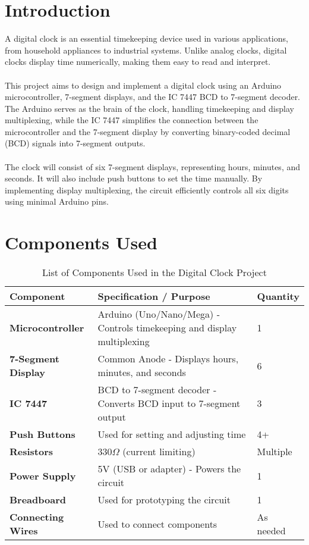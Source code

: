 \documentclass[journal]{IEEEtran}
\begin{document}
\section{Introduction}
A digital clock is an essential timekeeping device used in various applications, from household appliances to industrial systems. Unlike analog clocks, digital clocks display time numerically, making them easy to read and interpret. \\ \\
This project aims to design and implement a digital clock using an Arduino microcontroller, 7-segment displays, and the IC 7447 BCD to 7-segment decoder. The Arduino serves as the brain of the clock, handling timekeeping and display multiplexing, while the IC 7447 simplifies the connection between the microcontroller and the 7-segment display by converting binary-coded decimal (BCD) signals into 7-segment outputs. \\ \\
The clock will consist of six 7-segment displays, representing hours, minutes, and seconds. It will also include push buttons to set the time manually. By implementing display multiplexing, the circuit efficiently controls all six digits using minimal Arduino pins.


\section{Components Used}
\begin{table}[H]
    \centering
    \renewcommand{\arraystretch}{1.2} %
    \begin{tabular}{|p{4cm}|p{5cm}|p{2cm}|}
        \hline
        \textbf{Component} & \textbf{Specification / Purpose} & \textbf{Quantity} \\
        \hline
        \textbf{Microcontroller} & Arduino (Uno/Nano/Mega) - Controls timekeeping and display multiplexing & 1 \\
        \hline
        \textbf{7-Segment Display} & Common Anode - Displays hours, minutes, and seconds & 6 \\
        \hline
        \textbf{IC 7447} & BCD to 7-segment decoder - Converts BCD input to 7-segment output & 3 \\
        \hline
        \textbf{Push Buttons} & Used for setting and adjusting time & 4+ \\
        \hline
        \textbf{Resistors} &  330$\Omega$ (current limiting) & Multiple \\
        \hline
        \textbf{Power Supply} & 5V (USB or adapter) - Powers the circuit & 1 \\
        \hline
        \textbf{Breadboard} & Used for prototyping the circuit & 1 \\
        \hline
        \textbf{Connecting Wires} & Used to connect components & As needed \\
        \hline
    \end{tabular}
    \caption{List of Components Used in the Digital Clock Project}
    \label{tab:components}
\end{table}
\end{document}
